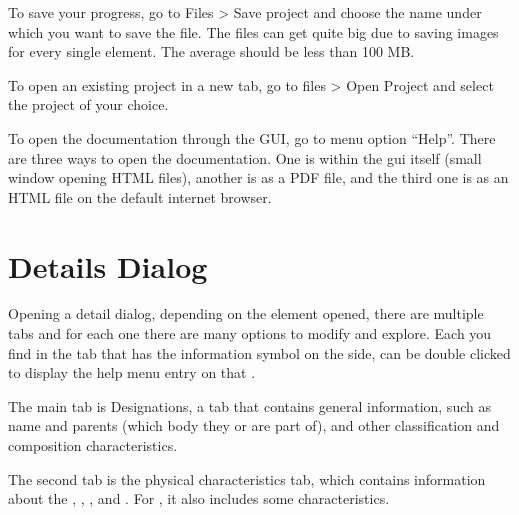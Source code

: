 \documentclass[letterpaper,10pt,english]{sphinxmanual}
\begin{document}
\sphinxAtStartPar
To save your progress, go to Files \sphinxhyphen{}\textgreater{} Save project and choose the name under
which you want to save the file. The files can get quite big due to saving
images for every single element. The average {\hyperref[\detokenize{celestial_systems/stellar_system:id1}]{}}
should be less than 100 MB.

\sphinxAtStartPar
To open an existing project in a new tab, go to files \sphinxhyphen{}\textgreater{} Open Project and
select the project of your choice.

\sphinxAtStartPar
To open the documentation through the GUI, go to menu option “Help”. There are three ways to open the
documentation. One is within the gui itself (small window opening HTML files),
another is as a PDF file, and the third one is as an HTML file on the default internet browser.


\section{Details Dialog}
\label{\detokenize{gui/gui:details-dialog}}
\sphinxAtStartPar
Opening a detail dialog, depending on the element opened, there
are multiple tabs and for each one there are many options to modify and explore.
Each {\hyperref[\detokenize{quantities/quantities:id1}]{}} you find in the tab that has the information
symbol on the side, can be double clicked to display the help menu entry on that
{\hyperref[\detokenize{quantities/quantities:id1}]{}}.

\sphinxAtStartPar
The main tab is Designations, a tab that contains general information,
such as name and parents (which body they {\hyperref[\detokenize{quantities/orbital/orbital:id1}]{}} or are part of),
and other classification and composition characteristics.

\sphinxAtStartPar
The second tab is the physical characteristics tab, which contains
information about the {\hyperref[\detokenize{quantities/material/mass:id1}]{}}, {\hyperref[\detokenize{quantities/geometric/radius:id1}]{}}, {\hyperref[\detokenize{quantities/rotational/spin_period:id1}]{}}, and {\hyperref[\detokenize{quantities/life/age:id1}]{}}.
For {\hyperref[\detokenize{celestial_bodies/star:id1}]{}}, it also includes some {\hyperref[\detokenize{quantities/surface/emission/emission:id1}]{}} characteristics.
\end{document}
